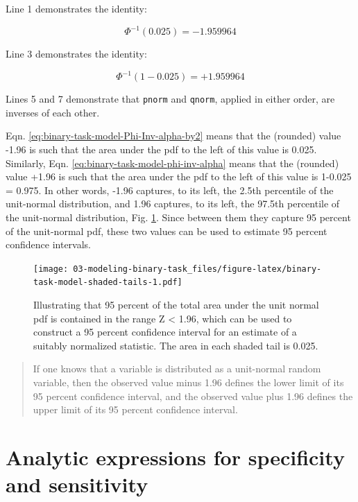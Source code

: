 \documentclass[
]{book}
\begin{document}
Line 1 demonstrates the identity:

\begin{equation} 
\Phi^{-1}(0.025)=-1.959964
\label{eq:binary-task-model-Phi-Inv-alpha-by2}
\end{equation}

Line 3 demonstrates the identity:

\begin{equation} 
\Phi^{-1}(1-0.025)=+1.959964
\label{eq:binary-task-model-phi-inv-alpha}
\end{equation}

Lines 5 and 7 demonstrate that \texttt{pnorm} and \texttt{qnorm}, applied in either order, are inverses of each other.

Eqn. \eqref{eq:binary-task-model-Phi-Inv-alpha-by2} means that the (rounded) value -1.96 is such that the area under the pdf to the left of this value is 0.025. Similarly, Eqn. \eqref{eq:binary-task-model-phi-inv-alpha} means that the (rounded) value +1.96 is such that the area under the pdf to the left of this value is 1-0.025 = 0.975. In other words, -1.96 captures, to its left, the 2.5th percentile of the unit-normal distribution, and 1.96 captures, to its left, the 97.5th percentile of the unit-normal distribution, Fig. \ref{fig:binary-task-model-shaded-tails}. Since between them they capture 95 percent of the unit-normal pdf, these two values can be used to estimate 95 percent confidence intervals.

\begin{figure}
\centering
\texttt{[image: 03-modeling-binary-task\_files/figure-latex/binary-task-model-shaded-tails-1.pdf]}
\caption{\label{fig:binary-task-model-shaded-tails}Illustrating that 95 percent of the total area under the unit normal pdf is contained in the range \textbar Z\textbar{} \textless{} 1.96, which can be used to construct a 95 percent confidence interval for an estimate of a suitably normalized statistic. The area in each shaded tail is 0.025.}
\end{figure}

\begin{quote}
If one knows that a variable is distributed as a unit-normal random variable, then the observed value minus 1.96 defines the lower limit of its 95 percent confidence interval, and the observed value plus 1.96 defines the upper limit of its 95 percent confidence interval.
\end{quote}

\hypertarget{binary-task-model-sensitivity-specificity}{%
\section{Analytic expressions for specificity and sensitivity}\label{binary-task-model-sensitivity-specificity}}
\end{document}
